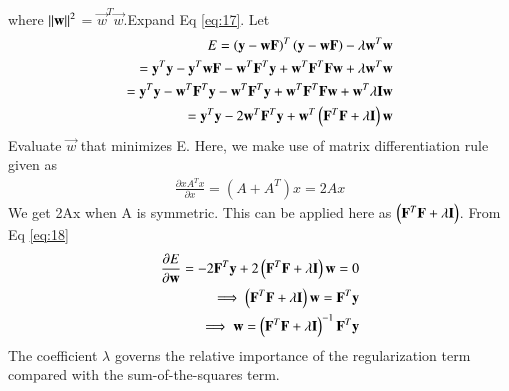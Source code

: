 \documentclass[journal,12pt,twocolumn]{IEEEtran}
\begin{document}
where $\left\lVert\mathbf{w}\right\rVert^2$ = $\vec{w}^T\vec{w}$.Expand Eq \eqref{eq:17}.
Let 
\begin{align}
    E = \left(\mathbf{y} - \mathbf{wF}\right)^T\left(\mathbf{y} - \mathbf{wF}\right) - \lambda\mathbf{w}^T\mathbf{w}\\
      = \mathbf{y}^T\mathbf{y} - \mathbf{y}^T\mathbf{wF} - \mathbf{w}^T\mathbf{F}^T\mathbf{y} + \mathbf{w}^T\mathbf{F}^T\mathbf{F}\mathbf{w} + \lambda\mathbf{w}^T\mathbf{w}\\
      = \mathbf{y}^T\mathbf{y} -\mathbf{w}^T\mathbf{F}^T\mathbf{y}  - \mathbf{w}^T\mathbf{F}^T\mathbf{y} + \mathbf{w}^T\mathbf{F}^T\mathbf{F}\mathbf{w} + \mathbf{w}^T\lambda\mathbf{I}\mathbf{w}\\
      = \mathbf{y}^T\mathbf{y} -2\mathbf{w}^T\mathbf{F}^T\mathbf{y}+\mathbf{w}^T\left(\mathbf{F}^T\mathbf{F} + \lambda\mathbf{I}\right)\mathbf{w}\label{eq:18}
\end{align}
Evaluate $\vec{w}$ that minimizes E. Here, we make use of matrix differentiation rule given as
\begin{align}
    \frac{\partial xA^Tx}{\partial x} = (A + A^T)x = 2Ax
\end{align}
We get 2Ax when A is symmetric. This can be applied here as $\left(\mathbf{F}^T\mathbf{F} + \lambda\mathbf{I}\right)$. From Eq \eqref{eq:18}
\begin{align}
    \frac{\partial E}{\partial \mathbf{w}} = -2\mathbf{F}^T\mathbf{y} + 2\left(\mathbf{F}^T\mathbf{F} + \lambda\mathbf{I}\right)\mathbf{w} = 0\\
    \implies \left(\mathbf{F}^T\mathbf{F} + \lambda\mathbf{I}\right)\mathbf{w} = \mathbf{F}^T\mathbf{y}\\
    \implies \mathbf{w} = \left(\mathbf{F}^T\mathbf{F} + \lambda\mathbf{I}\right)^{-1}\mathbf{F}^T\mathbf{y}
\end{align}
The coefficient $\lambda$ governs the relative importance of the regularization term compared with the sum-of-the-squares term.
\end{document}
